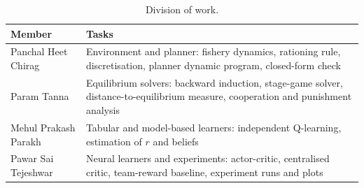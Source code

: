 \documentclass{article}
\begin{document}
\begin{table}[H]
  \centering
  \caption{Division of work.}
  \label{tab:work}
  \begin{tabular}{lp{10cm}}
    \toprule
    Member & Tasks \\
    \midrule
    Panchal Heet Chirag & Environment and planner: fishery dynamics, rationing rule, discretisation, planner dynamic program, closed-form check \\
    Param Tanna & Equilibrium solvers: backward induction, stage-game solver, distance-to-equilibrium measure, cooperation and punishment analysis \\
    Mehul Prakash Parakh & Tabular and model-based learners: independent Q-learning, estimation of $r$ and beliefs \\
    Pawar Sai Tejeshwar & Neural learners and experiments: actor-critic, centralised critic, team-reward baseline, experiment runs and plots \\
    \bottomrule
  \end{tabular}
\end{table}
\end{document}
